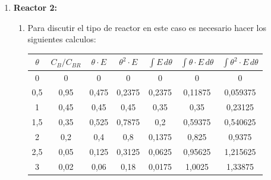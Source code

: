 \begin{enumerate}
\begin{enumerate}[label={\alph*)}]
\begin{align*}
\begin{aligned}
				            \frac{dC_i}{dz} & = \frac{-r_i}{V}
			            \end{aligned}
			            \right\}     & \Longrightarrow \frac{F}{S} = V
		            \end{align*}
	      \end{enumerate}
	      \newpage
	\item \textbf{Reactor 2:}
	      \begin{enumerate}[label={\alph*)}]
		      \item Para discutir el tipo de reactor en este caso es necesario hacer los siguientes calculos:
		            \begin{center}
			            \begin{tabular}{|c|c|c|c|c|c|c|}
				            \hline
				            $\theta$                     & $C_B/C_{BR}$          & $\theta \cdot E$ & $\theta^2 \cdot E$    & $\int E \, d\theta$ & $\int \theta \cdot E \, d\theta$ & $\int \theta^2 \cdot E \, d\theta$ \\ \hline
				            0                            & 0                     & 0                & 0                     & 0                   & 0                                & 0                                  \\ \hline
				            0,5                          & 0,95                  & 0,475            & 0,2375                & 0,2375              & 0,11875                          & 0,059375                           \\ \hline
				            1                            & 0,45                  & 0,45             & 0,45                  & 0,35                & 0,35                             & 0,23125                            \\ \hline
				            1,5                          & 0,35                  & 0,525            & 0,7875                & 0,2                 & 0,59375                          & 0,540625                           \\ \hline
				            2                            & 0,2                   & 0,4              & 0,8                   & 0,1375              & 0,825                            & 0,9375                             \\ \hline
				            2,5                          & 0,05                  & 0,125            & 0,3125                & 0,0625              & 0,95625                          & 1,215625                           \\ \hline
				            3                            & 0,02                  & 0,06             & 0,18                  & 0,0175              & 1,0025                           & 1,33875                            \\ \hline

\end{tabular}
\end{center}
\end{enumerate}
\end{enumerate}
